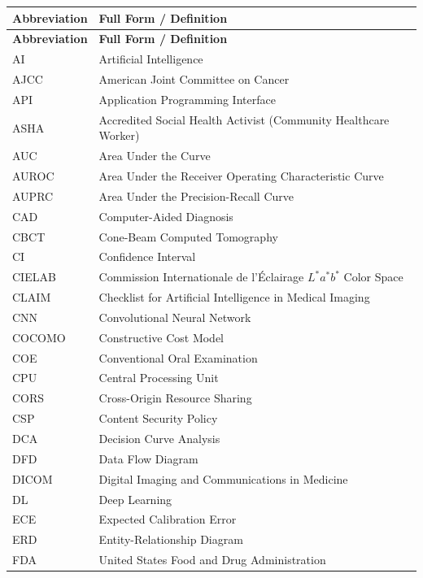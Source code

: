 \documentclass[12pt,a4paper,oneside]{report}
\begin{document}
\begin{longtable}{p{3.2cm} p{10.8cm}}
\toprule
\textbf{Abbreviation} & \textbf{Full Form / Definition} \\
\midrule
\endfirsthead
\toprule
\textbf{Abbreviation} & \textbf{Full Form / Definition} \\
\midrule
\endhead
\bottomrule
\endfoot
AI          & Artificial Intelligence \\
AJCC        & American Joint Committee on Cancer \\
API         & Application Programming Interface \\
ASHA        & Accredited Social Health Activist (Community Healthcare Worker) \\
AUC         & Area Under the Curve \\
AUROC       & Area Under the Receiver Operating Characteristic Curve \\
AUPRC       & Area Under the Precision-Recall Curve \\
CAD         & Computer-Aided Diagnosis \\
CBCT        & Cone-Beam Computed Tomography \\
CI          & Confidence Interval \\
CIELAB      & Commission Internationale de l'Éclairage $L^*a^*b^*$ Color Space \\
CLAIM       & Checklist for Artificial Intelligence in Medical Imaging \\
CNN         & Convolutional Neural Network \\
COCOMO      & Constructive Cost Model \\
COE         & Conventional Oral Examination \\
CPU         & Central Processing Unit \\
CORS        & Cross-Origin Resource Sharing \\
CSP         & Content Security Policy \\
DCA         & Decision Curve Analysis \\
DFD         & Data Flow Diagram \\
DICOM       & Digital Imaging and Communications in Medicine \\
DL          & Deep Learning \\
ECE         & Expected Calibration Error \\
ERD         & Entity-Relationship Diagram \\
FDA         & United States Food and Drug Administration \\

\end{longtable}
\end{document}
